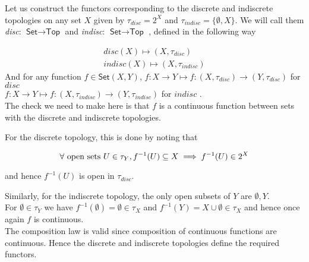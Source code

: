 \begin{frame}
    
Let us construct the functors corresponding to the discrete and indiscrete
topologies on any set \(X\) given by \(\tau_{disc} = 2^X\) and \(\tau_{indisc} =
\{\emptyset,X \}\). We will call them \textit{disc}: \(\textsf{Set} \to
\textsf{Top}\) and \textit{indisc}: \(\textsf{Set}\to \textsf{Top}\) , defined
in the following way 

\begin{gather*}
    \textit{disc}(X) \mapsto (X, \tau_{disc}) \\
    \textit{indisc}(X) \mapsto (X,\tau_{indisc}) 
\end{gather*}
And for any function \(f \in \textsf{Set}(X,Y)\), \(f:X\to Y\mapsto f:(X,
\tau_{disc})\to(Y,\tau_{disc})\) for \(disc\) \\ \(f:X\to Y\mapsto f:(X,
\tau_{indisc})\to(Y,\tau_{indisc})\) for \(indisc\) .
\\ \pause
The check we need to make here is that \(f\) is a continuous function between
sets with the discrete and indiscrete topologies. 
\end{frame}

\begin{frame}
    
 For the discrete topology, this is done by noting that 
 
 \begin{equation}
    \forall \textnormal{ open sets } U \in \tau_Y , f^{-1} (U) \subseteq X \implies f^{-1} (U)\in 2^X
 \end{equation}

    and hence \(f^{-1}(U)\) is open in \(\tau_{disc}\). 

\end{frame}
\begin{frame}
  Similarly, for the indiscrete topology, the only open subsets of \(Y\) are
    \({\emptyset,Y}\).  \\ For \(\emptyset \in \tau_Y\) we have
    \(f^{-1}(\emptyset) = \emptyset \in \tau_X \) and \(f^{-1}(Y) = X \cup
    \emptyset \in \tau_X \)  %
and hence once again \(f\) is continuous. \\The composition law is valid since
composition of continuous functions are continuous. Hence the discrete and
indiscrete topologies define the required functors. 

\end{frame}

